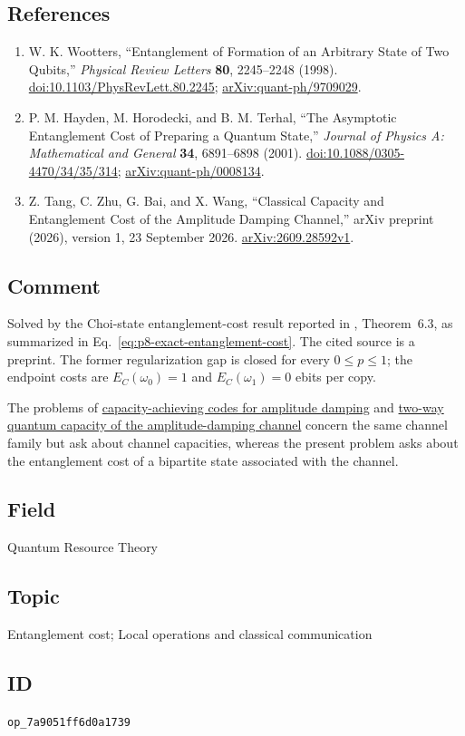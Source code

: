 \subsection*{References}

\begin{enumerate}[label={},leftmargin=4.8em,labelsep=0.5em]
  \footnotesize
  \item[\textup{[Woo98]}]\label{ref:p8-wootters}
  W. K. Wootters,
  ``Entanglement of Formation of an Arbitrary State of Two Qubits,''
  \emph{Physical Review Letters} \textbf{80}, 2245--2248 (1998).
  \href{https://doi.org/10.1103/PhysRevLett.80.2245}{doi:10.1103/PhysRevLett.80.2245};
  \href{https://arxiv.org/abs/quant-ph/9709029}{arXiv:quant-ph/9709029}.

  \item[\textup{[HHT01]}]\label{ref:p8-hayden-horodecki-terhal}
  P. M. Hayden, M. Horodecki, and B. M. Terhal,
  ``The Asymptotic Entanglement Cost of Preparing a Quantum State,''
  \emph{Journal of Physics A: Mathematical and General} \textbf{34},
  6891--6898 (2001).
  \href{https://doi.org/10.1088/0305-4470/34/35/314}{doi:10.1088/0305-4470/34/35/314};
  \href{https://arxiv.org/abs/quant-ph/0008134}{arXiv:quant-ph/0008134}.

  \item[\textup{[TZBW26]}]\label{ref:p8-tang-zhu-bai-wang}
  Z. Tang, C. Zhu, G. Bai, and X. Wang,
  ``Classical Capacity and Entanglement Cost of the Amplitude Damping Channel,''
  arXiv preprint (2026), version 1, 23 September 2026.
  \href{https://arxiv.org/abs/2609.28592v1}{arXiv:2609.28592v1}.
\end{enumerate}

\subsection*{Comment}

Solved by the Choi-state entanglement-cost result reported in
, Theorem~6.3, as summarized
in Eq.~\eqref{eq:p8-exact-entanglement-cost}.  The cited source is a
preprint.  The former regularization gap is closed for every $0\le p\le1$;
the endpoint costs are $E_C(\omega_0)=1$ and $E_C(\omega_1)=0$ ebits per copy.

The problems of
\href{https://qiqc-op.com/problem/op_fcd21a1a5021e464/}{capacity-achieving codes for amplitude damping}
and \href{https://qiqc-op.com/problem/op_e490c9462b37a548/}{two-way quantum capacity of the amplitude-damping channel}
concern the same channel family but ask about channel capacities, whereas the present problem asks about the entanglement cost of a
bipartite state associated with the channel.

\subsection*{Field}

Quantum Resource Theory

\subsection*{Topic}

Entanglement cost; Local operations and classical communication

\subsection*{ID}

\texttt{op\_7a9051ff6d0a1739}
